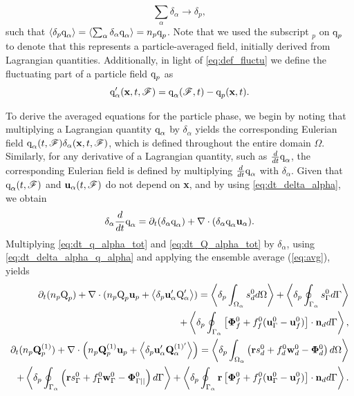\begin{equation*}
    \sum_\alpha \delta_\alpha \to \delta_p, 
\end{equation*}
such that $\left<\delta_{p} \text q_\alpha\right>=\left<\sum_\alpha \delta_\alpha \text q_\alpha\right>=n_p\text q_p$.
Note that we used the subscript $_p$ on $\text q_p$ to denote that this represents a particle-averaged field, initially derived from Lagrangian quantities. 
Additionally, in light of \ref{eq:def_fluctu} we define the fluctuating part of a particle field $\text q_p$ as
\begin{equation}
    \text q_\alpha'(\textbf{x},t,\FF) = \text q_\alpha(\FF,t) - \text q_p(\textbf{x},t). 
    \label{eq:def_fluc_p}
\end{equation}

To derive the averaged equations for the particle phase, we begin by noting that multiplying a Lagrangian quantity $\text q_\alpha$ by $\delta_\alpha$ yields the corresponding Eulerian field  $\text q_\alpha(t,\mathscr{F})\delta_\alpha(\textbf{x},t,\mathscr{F})$, which is defined throughout the entire domain $\Omega$. 
Similarly, for any derivative of a Lagrangian quantity, such as $\frac{d}{dt} \text q_\alpha$, the corresponding Eulerian field is defined by multiplying $\frac{d}{dt} \text q_\alpha$ with $\delta_\alpha$.
Given that $\text q_\alpha(t,\mathscr{F})$ and $\textbf{u}_\alpha(t,\mathscr{F})$ do not depend on \textbf{x}, and by using \ref{eq:dt_delta_alpha}, we obtain
\begin{equation}
    \delta_\alpha \ddt \text q_\alpha
    = \pddt (\delta_\alpha \text q_\alpha)
    + \div (\delta_\alpha \text q_\alpha \textbf{u}_\alpha).
    \label{eq:dt_delta_alpha_q_alpha}
\end{equation}
Multiplying \ref{eq:dt_q_alpha_tot} and \ref{eq:dt_Q_alpha_tot} by $\delta_\alpha$, using \ref{eq:dt_delta_alpha_q_alpha} and applying the ensemble average (\ref{eq:avg}), yields
\begin{align}
    \pddt (n_p\text Q_p)
    + \div (n_p \text Q_p \textbf{u}_p + \pavg{\textbf{u}_\alpha' \text Q_\alpha'})
    = \pOavg{ s_d^0 }
    + \pSavg{ s_\Gamma^0 }\nonumber\\
    + \pSavg{ \left[\mathbf{\Phi}_f^0 + f_f^0 (\textbf{u}_\Gamma^0-\textbf{u}_f^0) \right] \cdot \textbf{n}_d },
    \label{eq:avg_dt_dq_alpha_tot}\\
    \pddt (n_p\textbf{Q}_p^{(1)})
    + \div \left(n_p \textbf{Q}_p^{(1)} \textbf{u}_p + \pavg{\textbf{u}_\alpha' \textbf{Q}_\alpha^{(1)'}}\right)
    =\pOavg{ \left(
        \textbf{r} s_d^0         
        + f_d^0  \textbf{w}_d^0 
        - \mathbf{\Phi}_d^0
    \right) }\nonumber\\
    + \pSavg{ \left(
        \textbf{r}s_\Gamma^0
        + f_\Gamma^0 \textbf{w}_\Gamma^0
        - \mathbf{\Phi}_{\Gamma||}^0
    \right) }
    + \pSavg{ \textbf{r} \left[
        \mathbf{\Phi}_f^0
        + f_f^0 (\textbf{u}_\Gamma^0-\textbf{u}_f^0)
    \right]\cdot \textbf{n}_d  }.
    \label{eq:avg_dt_dQ_alpha_tot}
\end{align}
